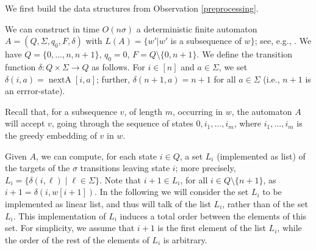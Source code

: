 \documentclass[10pt,a4paper]{amsart}
\makeatletter
\DeclareMathOperator{\nextpos}{nextA}
\theoremstyle{plain}
\theoremstyle{definition}
\renewenvironment{proof}[1][\proofname]{\par
  \pushQED{}%
  \normalfont \topsep6\p@\@plus6\p@\relax
  \trivlist
  \item[\hskip\labelsep\itshape #1\@addpunct{.}]\ignorespaces
}{%
  \popQED\endtrivlist\@endpefalse
}
\makeatother
\begin{document}
\begin{proof}
We first build the data structures from Observation \ref{preprocessing}.

We can construct in time $O(n\sigma)$ a deterministic finite automaton $A = (Q,\Sigma,q_0, F, \delta)$ with $L(A) = \{w' | w'$ is a subsequence of $w\}$; see, e.g., \cite{CrochemoreMT03}. We have $Q = \{0,\ldots,n,n+1\}$, $q_0 = 0$, $F=Q\setminus \{0,n+1\}$. We define the transition function $\delta:Q\times\Sigma\rightarrow Q$ as follows. For $i\in [n]$ and $a\in \Sigma$, we set $\delta(i,a) = \nextpos[i,a]$; further, $\delta(n+1,a)=n+1$ for all $a\in \Sigma $ (i.e., $n+1$ is an errror-state).

Recall that, for a subsequence $v$, of length $m$, occurring in $w$, the automaton $A$ will accept $v$, going through the sequence of states $0, i_1, \ldots, i_m$, where $i_1, \ldots, i_m$ is the greedy embedding of $v$ in $w$. 

Given $A$, we can compute, for each state $i\in Q$, a set $L_i$ (implemented as list) of the targets of the $\sigma$ transitions leaving state $i$; more precisely, $L_i = \{\delta(i,\ell)\mid \ell \in \Sigma \}$. Note that $i+1\in L_i$, for all $i\in Q\setminus \{n+1\}$, as $i+1=\delta(i,w[i+1])$.  In the following we will consider the set $L_i$ to be implemented as linear list, and thus will talk of the list $L_i$, rather than of the set $L_i$. This implementation of $L_i$ induces a total order between the elements of this set. For simplicity, we assume that $i+1$ is the first element of the list $L_i$, while the order of the rest of the elements of $L_i$ is arbitrary. 



\end{proof}
\end{document}
